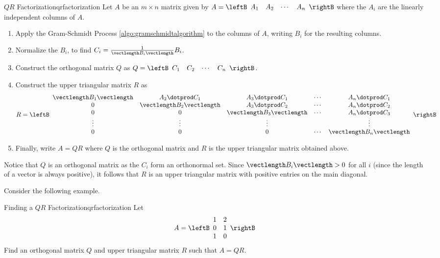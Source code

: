\begin{procedure}{$QR$ Factorization}{qrfactorization}
Let $A$ be an $m \times n$ matrix given by $A = \leftB 
\begin{array}{cccc}
A_1 & A_2 & \cdots & A_n 
\end{array}
\rightB$ where the $A_i$ are the linearly independent columns of $A$. 
\begin{enumerate}
\item
Apply the Gram-Schmidt Process \ref{algo:gramschmidtalgorithm} to the columns of $A$, writing $B_i$ for the resulting columns.

\item
Normalize the $B_i$, to find $C_i = \frac{1}{\vectlength B_i \vectlength} B_i$. 

\item
Construct the orthogonal matrix $Q$ as $Q=\leftB 
\begin{array}{cccc}
C_1 & C_2 & \cdots & C_n 
\end{array}
\rightB$. 

\item 
Construct the upper triangular matrix $R$ as 
\[ R = 
\leftB
\begin{array}{ccccc}
\vectlength B_1 \vectlength & A_2 \dotprod C_1 & A_3 \dotprod C_1 & \cdots & A_n \dotprod C_1 \\
0 & \vectlength B_2 \vectlength & A_3 \dotprod C_2 & \cdots & A_n \dotprod C_2 \\
0 & 0 & \vectlength B_3 \vectlength & \cdots & A_n \dotprod C_3 \\
\vdots & \vdots & \vdots & & \vdots \\
0 & 0 & 0 & \cdots & \vectlength B_n \vectlength 
\end{array}
\rightB
\]

\item
Finally, write $A=QR$ where $Q$ is the orthogonal matrix and $R$ is the upper triangular matrix obtained above. 
\end{enumerate} 
\end{procedure}

Notice that $Q$ is an orthogonal matrix as the $C_i$ form an orthonormal set. Since $\vectlength B_i \vectlength > 0$ for all $i$ (since the length of a vector is always positive), it follows that $R$ is an upper triangular matrix with positive entries on the main diagonal. 

Consider the following example.

\begin{example}{Finding a $QR$ Factorization}{qrfactorization}
Let \[
A = \leftB \begin{array}{rr}
1 & 2 \\
0 & 1 \\
1 & 0 
\end{array} \rightB
\]
Find an orthogonal matrix $Q$ and upper triangular matrix $R$ such that $A=QR$. 
\end{example}

